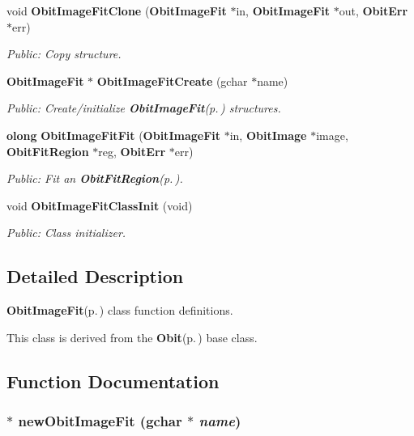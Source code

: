 \begin{CompactItemize}
void {\bf Obit\-Image\-Fit\-Clone} ({\bf Obit\-Image\-Fit} $\ast$in, {\bf Obit\-Image\-Fit} $\ast$out, {\bf Obit\-Err} $\ast$err)
\begin{CompactList}\small\item\em Public: Copy structure. \item\end{CompactList}\item 
{\bf Obit\-Image\-Fit} $\ast$ {\bf Obit\-Image\-Fit\-Create} (gchar $\ast$name)
\begin{CompactList}\small\item\em Public: Create/initialize {\bf Obit\-Image\-Fit}{\rm (p.\,\pageref{structObitImageFit})} structures. \item\end{CompactList}\item 
{\bf olong} {\bf Obit\-Image\-Fit\-Fit} ({\bf Obit\-Image\-Fit} $\ast$in, {\bf Obit\-Image} $\ast$image, {\bf Obit\-Fit\-Region} $\ast$reg, {\bf Obit\-Err} $\ast$err)
\begin{CompactList}\small\item\em Public: Fit an {\bf Obit\-Fit\-Region}{\rm (p.\,\pageref{structObitFitRegion})}. \item\end{CompactList}\item 
void {\bf Obit\-Image\-Fit\-Class\-Init} (void)
\begin{CompactList}\small\item\em Public: Class initializer. \item\end{CompactList}\end{CompactItemize}


\subsection{Detailed Description}
{\bf Obit\-Image\-Fit}{\rm (p.\,\pageref{structObitImageFit})} class function definitions. 

This class is derived from the {\bf Obit}{\rm (p.\,\pageref{structObit})} base class.

\subsection{Function Documentation}
\subsubsection{$\ast$ new\-Obit\-Image\-Fit (gchar $\ast$ {\em name})}\label{ObitImageFit_8c_a8}



